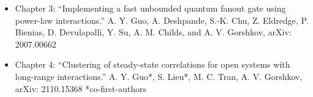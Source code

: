 \begin{itemize}
    \item Chapter 3: ``Implementing a fast unbounded quantum fanout gate using power-law interactions.'' A. Y. Guo, A. Deshpande, S.-K. Chu, Z. Eldredge, P. Bienias, D. Devulapalli, Y. Su, A. M. Childs, and A. V. Gorshkov, arXiv: 2007.00662

    \item Chapter 4: ``Clustering of steady-state correlations for open systems with long-range interactions.'' A. Y. Guo*, S. Lieu*, M. C. Tran, A. V. Gorshkov, arXiv: 2110.15368 *co-first-authors
\end{itemize}
%
%
%
%
%
